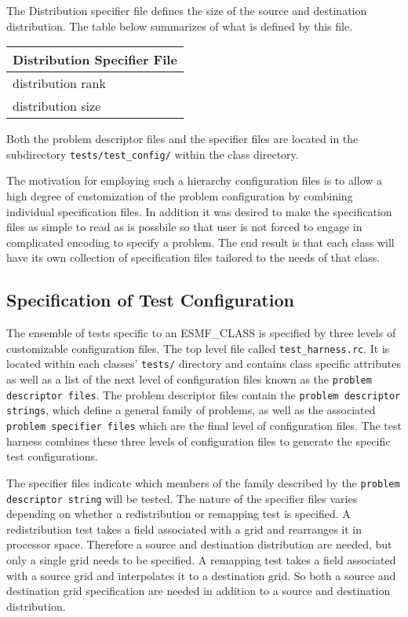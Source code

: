 The Distribution specifier file defines the size of the source and destination distribution. The table below summarizes of what is defined by this file. 
\begin{center}
\begin{tabular}{|l|} \hline \hline
Distribution Specifier File \\
\hline
distribution rank \\
distribution size \\
\hline
\end{tabular}
\end{center}
 Both the problem descriptor files and the specifier files are located in the subdirectory \texttt{tests/test\_config/} within the class directory.

The motivation for employing such a hierarchy configuration files is to allow a high degree of customization of the problem configuration by combining individual specification files. In addition it was desired to make the specification files as simple to read as is possbile so that user is not forced to engage in complicated encoding to specify a problem. The end result is that each class will have its own collection of specification files tailored to the needs of that class.

\subsection{Specification of Test Configuration}
The ensemble of tests specific to an {ESMF\_CLASS} is specified by three levels of customizable configuration files. The top level file called \texttt{test\_harness.rc}. It is located within each classes' \texttt{tests/} directory and contains class specific attributes as well as a list of the next level of configuration files known as the \texttt{problem descriptor files}. The problem descriptor files contain the \texttt{problem descriptor strings}, which define a general family of problems, as well as the associated \texttt{problem specifier files} which are the final level of configuration files. The test harness combines these three levels of configuration files to generate the specific test configurations. 

The specifier files indicate which members of the family described by the \texttt{problem descriptor string} will be tested. The nature of the specifier files varies depending on whether a redistribution or remapping test is specified. A redistribution test takes a field associated with a grid and rearranges it in processor space. Therefore a source and destination distribution are needed, but only a single grid needs to be specified. A remapping test takes a field associated with a source grid and interpolates it to a destination grid. So both a source and destination grid specification are needed in addition to a source and destination distribution.


